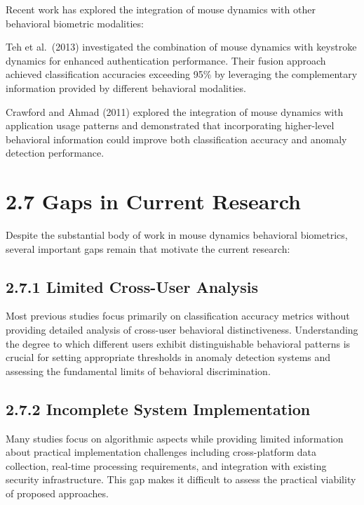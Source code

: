 \documentclass[
  12pt,
  a4paper,
]{report}
\begin{document}
Recent work has explored the integration of mouse dynamics with other
behavioral biometric modalities:

Teh et al.~(2013) investigated the combination of mouse dynamics with
keystroke dynamics for enhanced authentication performance. Their fusion
approach achieved classification accuracies exceeding 95\% by leveraging
the complementary information provided by different behavioral
modalities.

Crawford and Ahmad (2011) explored the integration of mouse dynamics
with application usage patterns and demonstrated that incorporating
higher-level behavioral information could improve both classification
accuracy and anomaly detection performance.

\section{2.7 Gaps in Current Research}\label{gaps-in-current-research}

Despite the substantial body of work in mouse dynamics behavioral
biometrics, several important gaps remain that motivate the current
research:

\subsection{2.7.1 Limited Cross-User
Analysis}\label{limited-cross-user-analysis}

Most previous studies focus primarily on classification accuracy metrics
without providing detailed analysis of cross-user behavioral
distinctiveness. Understanding the degree to which different users
exhibit distinguishable behavioral patterns is crucial for setting
appropriate thresholds in anomaly detection systems and assessing the
fundamental limits of behavioral discrimination.

\subsection{2.7.2 Incomplete System
Implementation}\label{incomplete-system-implementation}

Many studies focus on algorithmic aspects while providing limited
information about practical implementation challenges including
cross-platform data collection, real-time processing requirements, and
integration with existing security infrastructure. This gap makes it
difficult to assess the practical viability of proposed approaches.
\end{document}
